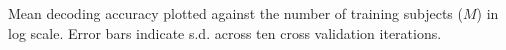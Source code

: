 \label{fig:change_n}
Mean decoding accuracy plotted against the number of training subjects ($M$) in log scale.
Error bars indicate s.d. across ten cross validation iterations.